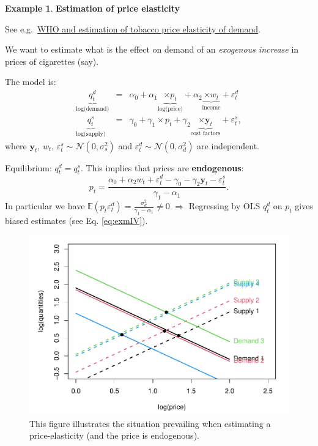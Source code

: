 \documentclass[
]{book}
\theoremstyle{definition}
\theoremstyle{definition}
\newtheorem{example}{Example}[chapter]
\theoremstyle{definition}
\theoremstyle{definition}
\theoremstyle{remark}
\begin{document}
\begin{example}
\protect\hypertarget{exm:priceElasticity}{}\label{exm:priceElasticity}\textbf{Estimation of price elasticity}

See e.g.~\href{http://www.who.int/tobacco/economics/2_2estimatingpriceincomeelasticities.pdf?ua=1}{WHO and estimation of tobacco price elasticity of demand}.

We want to estimate what is the effect on demand of an \emph{exogenous increase} in prices of cigarettes (say).

The model is:
\begin{eqnarray*}
\underbrace{q^d_t}_{\mbox{log(demand)}} &=& \alpha_0 + \alpha_1 \underbrace{\times p_t}_{\mbox{log(price)}} + \alpha_2 \underbrace{\times w_t}_{\mbox{income}} + \varepsilon_t^d\\
\underbrace{q^s_t}_{\mbox{log(supply)}} &=& \gamma_0 + \gamma_1 \times p_t + \gamma_2 \underbrace{\times \mathbf{y}_t}_{\mbox{cost factors}} + \varepsilon_t^s,
\end{eqnarray*}
where \(\mathbf{y}_t\), \(w_t\), \(\varepsilon_t^s \sim \mathcal{N}(0,\sigma^2_s)\) and \(\varepsilon_t^d \sim \mathcal{N}(0,\sigma^2_d)\) are independent.

Equilibrium: \(q^d_t = q^s_t\). This implies that prices are \textbf{endogenous}:
\[
p_t = \frac{\alpha_0 + \alpha_2 w_t + \varepsilon_t^d - \gamma_0 - \gamma_2 \mathbf{y}_t - \varepsilon_t^s}{\gamma_1 - \alpha_1}.
\]
In particular we have \(\mathbb{E}(p_t \varepsilon_t^d) = \frac{\sigma^2_d}{\gamma_1 - \alpha_1} \ne 0\) \(\Rightarrow\) Regressing by OLS \(q_t^d\) on \(p_t\) gives biased estimates (see Eq. \eqref{eq:exmIV}).
\end{example}

\begin{figure}
\centering
\includegraphics{bookdown-demo_files/figure-latex/figureIV-1.pdf}
\caption{\label{fig:figureIV}This figure illustrates the situation prevailing when estimating a price-elasticity (and the price is endogenous).}
\end{figure}
\end{document}
